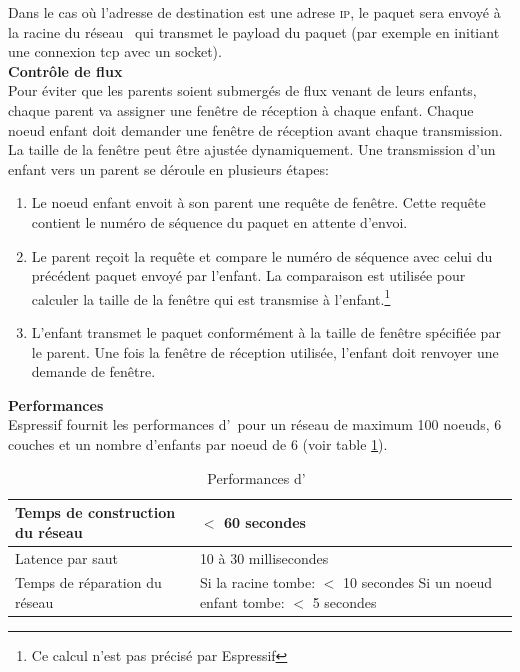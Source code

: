             Dans le cas où l'adresse de destination est une adrese \textsc{ip}, le paquet sera envoyé à la racine du réseau
            \espmesh\ qui transmet le payload du paquet (par exemple en initiant une connexion tcp avec un socket).
        \vspace{0.5cm}\\
        \textbf{Contrôle de flux}\\
            Pour éviter que les parents soient submergés de flux venant de leurs enfants, chaque parent va
            assigner une fenêtre de réception à chaque enfant. Chaque noeud enfant doit demander une fenêtre
            de réception avant chaque transmission. La taille de la fenêtre peut être ajustée dynamiquement.
            Une transmission d'un enfant vers un parent se déroule en plusieurs étapes:
            \begin{enumerate}
                \item Le noeud enfant envoit à son parent une requête de fenêtre. Cette requête contient le numéro de séquence du paquet en attente d'envoi.
                \item Le parent reçoit la requête et compare le numéro de séquence avec celui du précédent paquet envoyé par l'enfant.
                    La comparaison est utilisée pour calculer la taille de la fenêtre qui est transmise à l'enfant.\footnote{Ce calcul n'est pas précisé par Espressif}
                \item L'enfant transmet le paquet conformément à la taille de fenêtre spécifiée par le parent. Une fois la fenêtre de réception utilisée, l'enfant doit renvoyer une demande de fenêtre.
            \end{enumerate}
        \vspace{0.5cm}
        \textbf{Performances}\\
            Espressif fournit les performances d'\espmesh\ pour un réseau de maximum 100 noeuds, 6 couches et
            un nombre d'enfants par noeud de 6 (voir table \ref{performances_espMesh}).
            \begin{table}[H]
                \begin{tabular}{|l|l|}
                    \hline
                    Temps de construction du réseau & $<$ 60 secondes\\ \hline
                    Latence par saut & 10 à 30 millisecondes\\ \hline
                    Temps de réparation du réseau & \makecell{Si la racine tombe: $<$ 10 secondes \\ Si un noeud enfant tombe: $<$ 5 secondes}\\ \hline
                \end{tabular}
                \caption{Performances d'\espmesh\ \cite{esp-mesh_w}}
                \label{performances_espMesh}
            \end{table}

